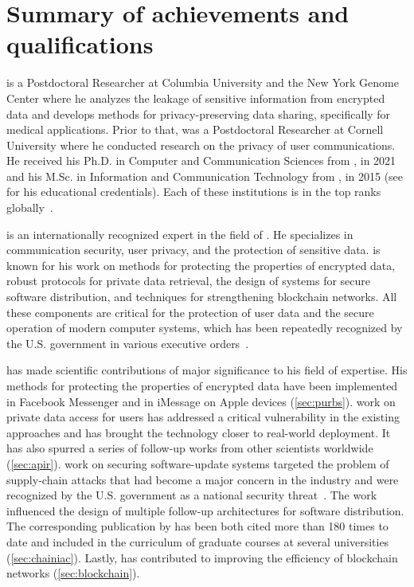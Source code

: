 \clearpage
\section{Summary of \drs achievements and qualifications}
\label{sec:summary}

\drfull is a Postdoctoral Researcher at Columbia University and the New York
Genome Center where he analyzes the leakage of sensitive information from
encrypted data and develops methods for privacy-preserving
data sharing, specifically for medical applications.
Prior to that, \dr was a Postdoctoral Researcher at Cornell University
where he conducted research on the privacy of user communications.
He received his Ph.D. in Computer and Communication Sciences from \epfl, in 2021
and his M.Sc. in Information and Communication Technology from \kth, in 2015
(see  for his educational credentials).
Each of these institutions is in the top ranks globally~\cite{universities}.

\dr is an internationally recognized expert in the field of \dpcs.
He specializes in communication security, user privacy, and the protection of
sensitive data.
\dr is known for his work on methods for protecting the properties of encrypted
data, robust protocols for private data retrieval, the design of
systems for secure software distribution, and techniques for strengthening
blockchain networks.
All these components are critical for the protection of user data and the secure
operation of modern computer systems, which has been repeatedly recognized by
the U.S. government in various executive orders~\cite{government}.

\dr has made scientific contributions of major significance to his field of
expertise.
His methods for protecting the properties of encrypted data have been
implemented in Facebook Messenger and in iMessage on Apple devices
(\cref{sec:purbs}).
\drs work on private data access for users has addressed a critical
vulnerability in the existing approaches and has brought the technology closer
to real-world deployment.
It has also spurred a series of follow-up works from other scientists worldwide
(\cref{sec:apir}).
\drs work on securing software-update systems targeted the problem of
supply-chain attacks that had become a major concern in the industry and
were recognized by the U.S. government as a national security
threat~\cite{government}.
The work influenced the design of multiple follow-up architectures for software
distribution.
The corresponding publication by \dr has been both cited more than
180 times to date and included in the curriculum of graduate courses
at several universities (\cref{sec:chainiac}).
Lastly, \dr has contributed to improving the efficiency of
blockchain networks (\cref{sec:blockchain}).

